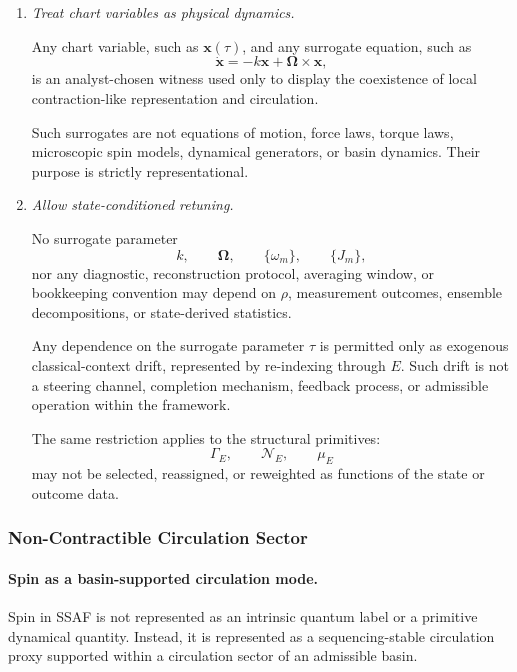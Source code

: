 \documentclass[aps,prx,onecolumn,11pt]{revtex4-2}
\theoremstyle{plain}
\theoremstyle{definition}
\theoremstyle{remark}
\begin{document}
\begin{enumerate}[label=(\roman*), leftmargin=2.2em]

\item \emph{Treat chart variables as physical dynamics.}

Any chart variable, such as \(\mathbf{x}(\tau)\), and any surrogate
equation, such as
\[
\dot{\mathbf{x}}
=
-k\mathbf{x}
+
\boldsymbol{\Omega}\times\mathbf{x},
\]
is an analyst-chosen witness used only to display the coexistence of
local contraction-like representation and circulation.

Such surrogates are not equations of motion, force laws, torque laws,
microscopic spin models, dynamical generators, or basin dynamics. Their
purpose is strictly representational.

\item \emph{Allow state-conditioned retuning.}

No surrogate parameter
\[
k,
\qquad
\boldsymbol{\Omega},
\qquad
\{\omega_m\},
\qquad
\{J_m\},
\]
nor any diagnostic, reconstruction protocol, averaging window, or
bookkeeping convention may depend on \(\rho\), measurement outcomes,
ensemble decompositions, or state-derived statistics.

Any dependence on the surrogate parameter \(\tau\) is permitted only as
exogenous classical-context drift, represented by re-indexing through
\(E\). Such drift is not a steering channel, completion mechanism,
feedback process, or admissible operation within the framework.

The same restriction applies to the structural primitives:
\[
\Gamma_E,
\qquad
\mathcal N_E,
\qquad
\mu_E
\]
may not be selected, reassigned, or reweighted as functions of the state
or outcome data.

\end{enumerate}

\subsubsection{Non-Contractible Circulation Sector}
\label{toy:spin_proxy:noncontractible}

\paragraph{Spin as a basin-supported circulation mode.}

Spin in SSAF is not represented as an intrinsic quantum label or a
primitive dynamical quantity. Instead, it is represented as a
sequencing-stable circulation proxy supported within a circulation
sector of an admissible basin.
\end{document}
